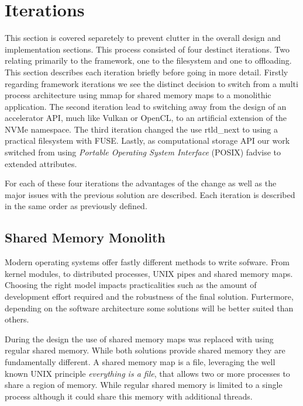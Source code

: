 
\section{Iterations}

This section is covered separetely to prevent clutter in the overall design and
implementation sections. This process consisted of four destinct iterations.
Two relating primarily to the framework, one to the filesystem and one to
offloading. This section describes each iteration briefly before going in more
detail. Firstly regarding framework iterations we see the distinct decision
to switch from a multi process architecture using mmap for shared memory maps to
a monolithic application. The second iteration lead to switching away from the
design of an accelerator API, much like Vulkan \cite{vulkan} or OpenCL, to an
artificial extension of the NVMe namespace. The third iteration changed the use
rtld\_next \cite{rtldnext} to using a practical filesystem with FUSE. Lastly, as
computational storage API our work switched from using
\textit{Portable Operating System Interface} (POSIX) fadvise \cite{fadvise} to
extended attributes.

For each of these four iterations the advantages of the change as well as the
major issues with the previous solution are described. Each iteration is
described in the same order as previously defined.

\subsection{Shared Memory Monolith}

Modern operating systems offer fastly different methods to write sofware. From
kernel modules, to distributed processes, UNIX pipes and shared memory maps.
Choosing the right model impacts practicalities such as the amount of
development effort required and the robustness of the final solution. 
Furtermore, depending on the software architecture some solutions will be better
suited than others.

During the design the use of shared memory maps was replaced with using regular
shared memory. While both solutions provide shared memory they are fundamentally
different. A shared memory map is a file, leveraging the well known UNIX
principle \textit{everything is a file}, that allows two or more processes to
share a region of memory. While regular shared memory is limited to a single
process although it could share this memory with additional threads.

